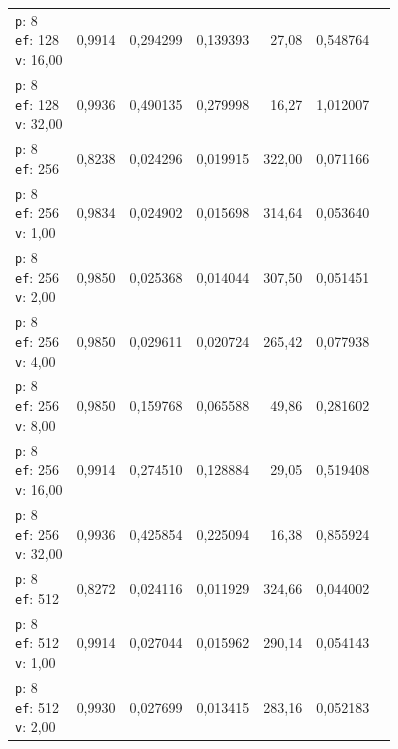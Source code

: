 \begin{table}[htbp]
\begin{tabularx}{\textwidth}{Xrrrrrr}
    \makecell{\texttt{p}: 8\\\texttt{ef}: 128\\\texttt{v}: 16,00} & 0,9914 & 0,294299 & 0,139393 & 27,08 & 0,548764 \\
    \makecell{\texttt{p}: 8\\\texttt{ef}: 128\\\texttt{v}: 32,00} & 0,9936 & 0,490135 & 0,279998 & 16,27 & 1,012007 \\
    \makecell{\texttt{p}: 8\\\texttt{ef}: 256} & 0,8238 & 0,024296 & 0,019915 & 322,00 & 0,071166 \\
    \makecell{\texttt{p}: 8\\\texttt{ef}: 256\\\texttt{v}: 1,00} & 0,9834 & 0,024902 & 0,015698 & 314,64 & 0,053640 \\
    \makecell{\texttt{p}: 8\\\texttt{ef}: 256\\\texttt{v}: 2,00} & 0,9850 & 0,025368 & 0,014044 & 307,50 & 0,051451 \\
    \makecell{\texttt{p}: 8\\\texttt{ef}: 256\\\texttt{v}: 4,00} & 0,9850 & 0,029611 & 0,020724 & 265,42 & 0,077938 \\
    \makecell{\texttt{p}: 8\\\texttt{ef}: 256\\\texttt{v}: 8,00} & 0,9850 & 0,159768 & 0,065588 & 49,86 & 0,281602 \\
    \makecell{\texttt{p}: 8\\\texttt{ef}: 256\\\texttt{v}: 16,00} & 0,9914 & 0,274510 & 0,128884 & 29,05 & 0,519408 \\
    \makecell{\texttt{p}: 8\\\texttt{ef}: 256\\\texttt{v}: 32,00} & 0,9936 & 0,425854 & 0,225094 & 16,38 & 0,855924 \\
    \makecell{\texttt{p}: 8\\\texttt{ef}: 512} & 0,8272 & 0,024116 & 0,011929 & 324,66 & 0,044002 \\
    \makecell{\texttt{p}: 8\\\texttt{ef}: 512\\\texttt{v}: 1,00} & 0,9914 & 0,027044 & 0,015962 & 290,14 & 0,054143 \\
    \makecell{\texttt{p}: 8\\\texttt{ef}: 512\\\texttt{v}: 2,00} & 0,9930 & 0,027699 & 0,013415 & 283,16 & 0,052183 \\

\end{tabularx}
\end{table}
